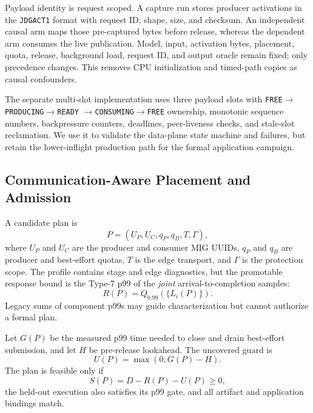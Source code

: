 Payload identity is request scoped.  A capture run stores producer activations
in the \texttt{JDGACT1} format with request ID, shape, size, and checksum.  An
independent causal arm maps those pre-captured bytes before release, whereas
the dependent arm consumes the live publication.  Model, input, activation
bytes, placement, quota, release, background load, request ID, and output
oracle remain fixed; only precedence changes.  This removes CPU
initialization and timed-path copies as causal confounders.

The separate multi-slot implementation uses three payload slots with
\texttt{FREE}$\rightarrow$\texttt{PRODUCING}$\rightarrow$\texttt{READY}
$\rightarrow$\texttt{CONSUMING}$\rightarrow$\texttt{FREE} ownership,
monotonic sequence numbers, backpressure counters, deadlines, peer-liveness
checks, and stale-slot reclamation.  We use it to validate the data-plane
state machine and failures, but retain the lower-inflight production path for
the formal application campaign.

\subsection{Communication-Aware Placement and Admission}
\label{sec:planner}

A candidate plan is
\begin{equation}
  P=(U_P,U_C,q_P,q_B,T,\Gamma),
\end{equation}
where $U_P$ and $U_C$ are the producer and consumer MIG UUIDs, $q_P$ and $q_B$
are producer and best-effort quotas, $T$ is the edge transport, and $\Gamma$
is the protection scope.  The profile contains stage and edge diagnostics, but
the promotable response bound is the Type-7 p99 of the \emph{joint}
arrival-to-completion samples:
\begin{equation}
  R(P)=Q_{0.99}\!\left(\{L_i(P)\}\right).
  \label{eq:joint-tail}
\end{equation}
Legacy sums of component p99s may guide characterization but cannot authorize
a formal plan.

Let $G(P)$ be the measured p99 time needed to close and drain best-effort
submission, and let $H$ be pre-release lookahead.  The uncovered guard is
\begin{equation}
  U(P)=\max(0,G(P)-H).
\end{equation}
The plan is feasible only if
\begin{equation}
  S(P)=D-R(P)-U(P)\ge 0,
  \label{eq:slack}
\end{equation}
the held-out execution also satisfies its p99 gate, and all artifact and
application bindings match.


